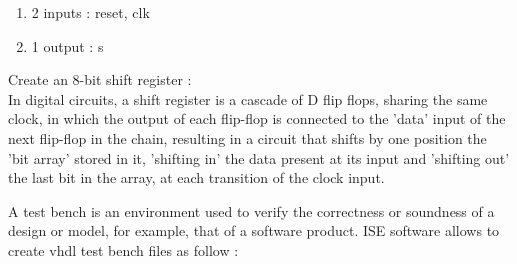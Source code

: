 \documentclass[12pt]{tdtp}
\begin{document}
\begin{enumerate}
	\item 2 inputs : reset, clk
	\item 1 output : s
\end{enumerate}




\Exo

Create an 8-bit shift register : \\

In digital circuits, a shift register is a cascade of D flip flops, sharing the same clock, in which the output of each flip-flop is connected to the 'data' input of the next flip-flop in the chain, resulting in a circuit that shifts by one position the 'bit array' stored in it, 'shifting in' the data present at its input and 'shifting out' the last bit in the array, at each transition of the clock input.




\Note

A test bench is an environment used to verify the correctness or soundness of a design or model, for example, that of a software product.
ISE software allows to create vhdl test bench files as follow :  
\end{document}

